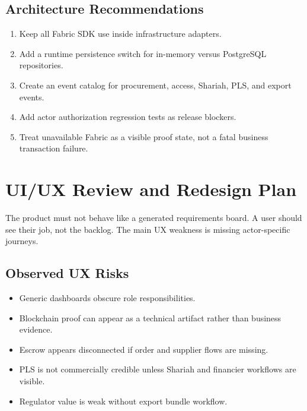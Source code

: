 \documentclass[conference]{IEEEtran}
\begin{document}
\subsection{Architecture Recommendations}
\begin{enumerate}
    \item Keep all Fabric SDK use inside infrastructure adapters.
    \item Add a runtime persistence switch for in-memory versus PostgreSQL repositories.
    \item Create an event catalog for procurement, access, Shariah, PLS, and export events.
    \item Add actor authorization regression tests as release blockers.
    \item Treat unavailable Fabric as a visible proof state, not a fatal business transaction failure.
\end{enumerate}

\section{UI/UX Review and Redesign Plan}

The product must not behave like a generated requirements board. A user should see their job, not the backlog. The main UX weakness is missing actor-specific journeys.

\subsection{Observed UX Risks}
\begin{itemize}
    \item Generic dashboards obscure role responsibilities.
    \item Blockchain proof can appear as a technical artifact rather than business evidence.
    \item Escrow appears disconnected if order and supplier flows are missing.
    \item PLS is not commercially credible unless Shariah and financier workflows are visible.
    \item Regulator value is weak without export bundle workflow.
\end{itemize}
\end{document}
